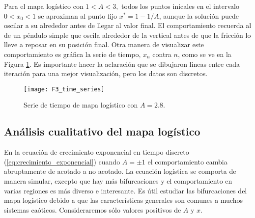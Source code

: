             Para el mapa logístico con $1 < A < 3,$ todos los puntos inicales en el intervalo $0 < x_{0} < 1$ se aproximan al punto fijo $x^{*} = 1 - 1/ A $, aunque la solución puede oscilar a su alrededor antes de llegar al valor final. El comportamiento recuerda al de un péndulo simple que oscila alrededor de la vertical antes de que la fricción lo lleve a reposar en su posición final. Otra manera de visualizar este comportamiento es gráfica la serie de tiempo, $x_{n}$ contra $n$, como se ve en la Figura \ref{fig:F3_time_series}. Es importante hacer la aclaración que se dibujaron lineas entre cada iteración para una mejor visualización, pero los datos son discretos. 

            \begin{figure}[hbtp]
                \caption{Serie de tiempo de mapa logístico con $A = 2.8$.}
                \centering
                \texttt{[image: F3\_time\_series]}
                \label{fig:F3_time_series}
            \end{figure}

        \subsection{Análisis cualitativo del mapa logístico }

            En la ecuación de crecimiento exponencial en tiempo discreto (\ref{eq:crecimiento_exponencial}) cuando $A = \pm 1$ el comportamiento cambia abruptamente de acotado a no acotado. La ecuación logística se comporta de manera simular, excepto que hay más bifurcaciones y el comportamiento en varias regiones es más diverso e interesante. Es útil estudiar las bifurcaciones del mapa logístico debido a que las características generales son comunes a muchos sistemas caóticos. Consideraremos sólo valores positivos de $A$ y $x$.

